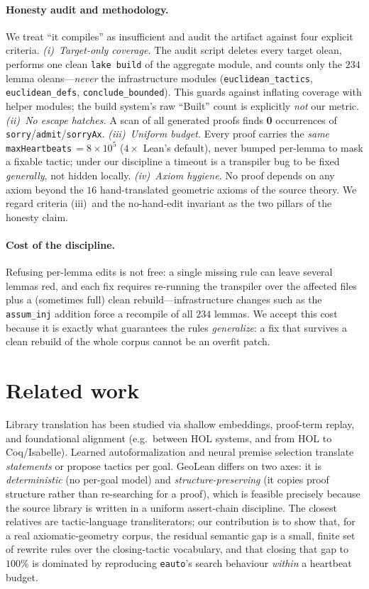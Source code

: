 \documentclass{article}
\begin{document}
\paragraph{Honesty audit and methodology.}
We treat ``it compiles'' as insufficient and audit the artifact against four explicit criteria.
\emph{(i)~Target-only coverage.} The audit script deletes every target olean, performs one clean
\texttt{lake build} of the aggregate module, and counts only the $234$ lemma oleans---\emph{never}
the infrastructure modules (\texttt{euclidean\_tactics}, \texttt{euclidean\_defs},
\texttt{conclude\_bounded}). This guards against inflating coverage with helper modules; the build
system's raw ``Built'' count is explicitly \emph{not} our metric. \emph{(ii)~No escape hatches.}
A scan of all generated proofs finds \textbf{0} occurrences of
\texttt{sorry}/\texttt{admit}/\texttt{sorryAx}. \emph{(iii)~Uniform budget.} Every proof carries the
\emph{same} \texttt{maxHeartbeats}$\,=8{\times}10^5$ ($4{\times}$ Lean's default), never bumped
per-lemma to mask a fixable tactic; under our discipline a timeout is a transpiler bug to be fixed
\emph{generally}, not hidden locally. \emph{(iv)~Axiom hygiene.} No proof depends on any axiom
beyond the $16$ hand-translated geometric axioms of the source theory. We regard criteria
(iii)~and the no-hand-edit invariant as the two pillars of the honesty claim.

\paragraph{Cost of the discipline.}
Refusing per-lemma edits is not free: a single missing rule can leave several lemmas red, and
each fix requires re-running the transpiler over the affected files plus a (sometimes full) clean
rebuild---infrastructure changes such as the \texttt{assum\_inj} addition force a recompile of all
$234$ lemmas. We accept this cost because it is exactly what guarantees the rules \emph{generalize}:
a fix that survives a clean rebuild of the whole corpus cannot be an overfit patch.

\section{Related work}

Library translation has been studied via shallow embeddings, proof-term replay, and foundational
alignment (e.g.\ between HOL systems, and from HOL to Coq/Isabelle). Learned autoformalization and
neural premise selection translate \emph{statements} or propose tactics per goal. GeoLean differs
on two axes: it is \emph{deterministic} (no per-goal model) and \emph{structure-preserving} (it
copies proof structure rather than re-searching for a proof), which is feasible precisely because
the source library is written in a uniform assert-chain discipline. The closest relatives are
tactic-language transliterators; our contribution is to show that, for a real axiomatic-geometry
corpus, the residual semantic gap is a small, finite set of rewrite rules over the closing-tactic
vocabulary, and that closing that gap to $100\%$ is dominated by reproducing \texttt{eauto}'s
search behaviour \emph{within} a heartbeat budget.
\end{document}
